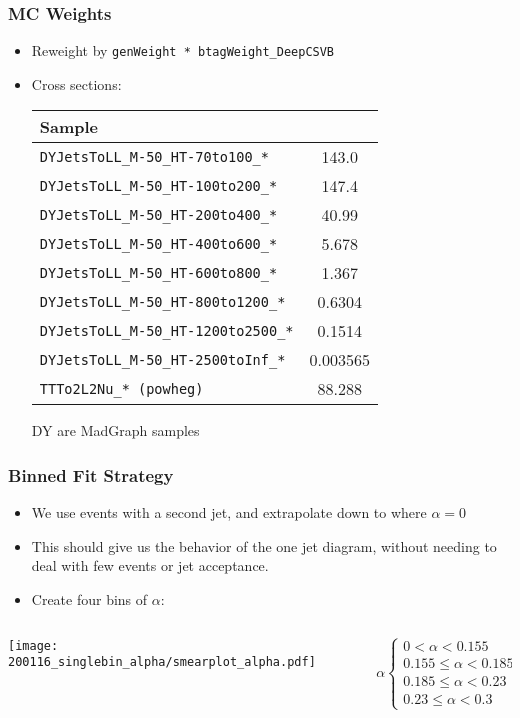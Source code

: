 \documentclass{beamer}
\begin{document}
\begin{frame}
  \frametitle{MC Weights}

  \begin{itemize}
  \item Reweight by \texttt{genWeight * btagWeight\_DeepCSVB}
  \item Cross sections:
    \vfill
    \begin{tabular}{|l|S|}
      \hline
      Sample &  \\
      \hline
      \texttt{DYJetsToLL\_M-50\_HT-70to100\_*} & 143.0 \\
      \texttt{DYJetsToLL\_M-50\_HT-100to200\_*} & 147.4 \\
      \texttt{DYJetsToLL\_M-50\_HT-200to400\_*} & 40.99 \\
      \texttt{DYJetsToLL\_M-50\_HT-400to600\_*} & 5.678 \\
      \texttt{DYJetsToLL\_M-50\_HT-600to800\_*} & 1.367 \\
      \texttt{DYJetsToLL\_M-50\_HT-800to1200\_*} & 0.6304 \\
      \texttt{DYJetsToLL\_M-50\_HT-1200to2500\_*} & 0.1514 \\
      \texttt{DYJetsToLL\_M-50\_HT-2500toInf\_*} & 0.003565 \\
      \texttt{TTTo2L2Nu\_* (powheg)} & 88.288 \\
      \hline
    \end{tabular}
    \vfill
    DY are MadGraph samples
  \end{itemize}

\end{frame}


\begin{frame}
  \frametitle{Binned Fit Strategy}

  \begin{itemize}
  \item We use events with a second jet, and extrapolate down to where $\alpha = 0$
  \item This should give us the behavior of the one jet diagram,
    without needing to deal with few events or jet acceptance.
  \item Create four bins of $\alpha$:
  \end{itemize}
  \begin{columns}
    \begin{column}{0.5\linewidth}
      \texttt{[image: 200116\_singlebin\_alpha/smearplot\_alpha.pdf]}
    \end{column}
    \begin{column}{0.5\linewidth}
      \[
      \alpha
      \begin{cases}
        0 < \alpha < 0.155 \\
        0.155 \le \alpha < 0.185 \\
        0.185 \le \alpha < 0.23 \\
        0.23 \le \alpha < 0.3
      \end{cases}
      \]
    \end{column}
  \end{columns}


\end{frame}
\end{document}
